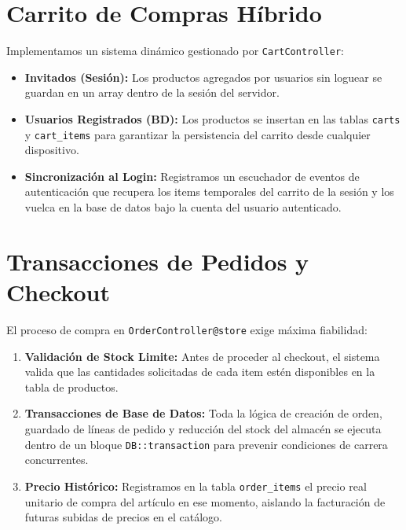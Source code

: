 \section{Carrito de Compras Híbrido}
Implementamos un sistema dinámico gestionado por \texttt{CartController}:
\begin{itemize}
    \item \textbf{Invitados (Sesión):} Los productos agregados por usuarios sin loguear se guardan en un array dentro de la sesión del servidor.
    \item \textbf{Usuarios Registrados (BD):} Los productos se insertan en las tablas \texttt{carts} y \texttt{cart\_items} para garantizar la persistencia del carrito desde cualquier dispositivo.
    \item \textbf{Sincronización al Login:} Registramos un escuchador de eventos de autenticación que recupera los items temporales del carrito de la sesión y los vuelca en la base de datos bajo la cuenta del usuario autenticado.
\end{itemize}

\section{Transacciones de Pedidos y Checkout}
El proceso de compra en \texttt{OrderController@store} exige máxima fiabilidad:
\begin{enumerate}
    \item \textbf{Validación de Stock Limite:} Antes de proceder al checkout, el sistema valida que las cantidades solicitadas de cada item estén disponibles en la tabla de productos.
    \item \textbf{Transacciones de Base de Datos:} Toda la lógica de creación de orden, guardado de líneas de pedido y reducción del stock del almacén se ejecuta dentro de un bloque \texttt{DB::transaction} para prevenir condiciones de carrera concurrentes.
    \item \textbf{Precio Histórico:} Registramos en la tabla \texttt{order\_items} el precio real unitario de compra del artículo en ese momento, aislando la facturación de futuras subidas de precios en el catálogo.
\end{enumerate}

